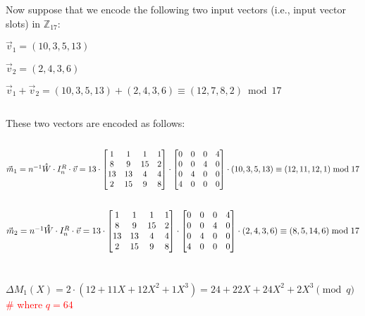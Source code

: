 $ $

Now suppose that we encode the following two input vectors (i.e., input vector slots) in $\mathbb{Z}_{17}$:

$\vec{v}_1 = (10, 3, 5, 13)$

$\vec{v}_2 = (2, 4, 3, 6)$

$\vec{v}_1 + \vec{v}_2 = (10, 3, 5, 13) + (2, 4, 3, 6) \equiv (12, 7, 8, 2) \bmod 17$

$ $

These two vectors are encoded as follows:

$ $

$\vec{m}_1 = n^{-1} \hathat{W} \cdot I_n^R \cdot \vec{v} = 13 \cdot \begin{bmatrix}
1 & 1 & 1 & 1\\
8 & 9 & 15 & 2\\
13 & 13 & 4 & 4\\
2 & 15 & 9 & 8\\
\end{bmatrix} \cdot \begin{bmatrix}
0 & 0 & 0 & 4\\
0 & 0 & 4 & 0\\
0 & 4 & 0 & 0\\
4 & 0 & 0 & 0\\
\end{bmatrix} \cdot (10, 3, 5, 13) \equiv (12, 11, 12,1)  \bmod 17$

$ $

$\vec{m}_2 = n^{-1} \hathat{W} \cdot I_n^R \cdot \vec{v} = 13 \cdot \begin{bmatrix}
1 & 1 & 1 & 1\\
8 & 9 & 15 & 2\\
13 & 13 & 4 & 4\\
2 & 15 & 9 & 8\\
\end{bmatrix} \cdot \begin{bmatrix}
0 & 0 & 0 & 4\\
0 & 0 & 4 & 0\\
0 & 4 & 0 & 0\\
4 & 0 & 0 & 0\\
\end{bmatrix} \cdot (2, 4, 3, 6) \equiv (8, 5, 14, 6) \bmod 17$

$ $

$ $

$\Delta M_1(X) = 2\cdot(12 + 11X + 12X^2 + 1X^3) = 24 + 22X + 24X^2 + 2X^3 \pmod{q}$ \textcolor{red}{\text{ } \# where $q = 64$}

